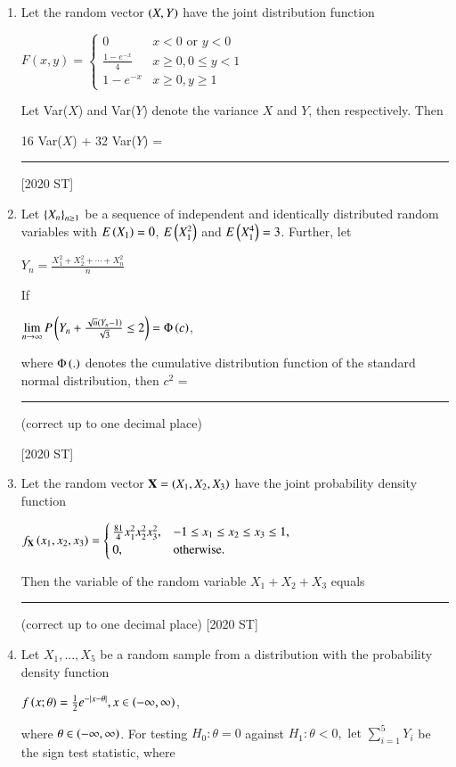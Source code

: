 \documentclass[journal]{IEEEtran}
\begin{document}
\begin{enumerate}
    \hfill [2020 ST]
    \item Let the random vector $\left(X,Y\right)$ have the joint distribution function 
    \begin{center}
        $F(x,y) = 
        \begin{cases}
            0 & x < 0 \text{ or } y < 0 \\
            \frac{1 - e ^{-x}}{4} & x \geq 0, 0 \leq y < 1 \\
            1 - e^{-x}& x \geq 0, y \geq 1
        \end{cases}$
    \end{center}
    Let Var($X$) and Var($Y$) denote the variance $X$ and $Y$, then respectively. Then 
    \begin{center}
        16 Var($X$) + 32 Var($Y$) = \rule{2cm}{0.4pt}
    \end{center}
    \hfill [2020 ST]
    \item Let $\left\{X_n\right\}_{n \geq 1}$ be a sequence of independent and identically distributed random variables with $E\left(X_1\right) = 0$, $E\left(X_1^2\right)$ and $E\left(X_1^4\right) = 3$. Further, let 
\begin{center}
    $Y_n = \frac{X_1^2 + X_2^2 +  \cdots + X_n^2}{n}$
\end{center}
If
\begin{center}
    $\lim \limits_{n \to \infty} P \left(Y_n + \frac{\sqrt{n}\left(Y_n - 1\right)}{\sqrt{3}} \leq 2\right) = \Phi\left(c\right)$,
\end{center}
where $\Phi\left(.\right)$ denotes the cumulative distribution function of the standard normal distribution, then $c^2$ = \rule{2cm}{0.4pt}(correct up to one decimal place)

\hfill [2020 ST]
\item Let the random vector $\mathbf{X} = \left(X_1, X_2, X_3\right)$ have the joint probability density function 
\begin{center}
    $f_{\mathbf{X}}\left(x_1,x_2,x_3\right) = 
    \begin{cases}
    \frac{81}{4} x_1^2 x_2^2 x_3^2, & -1 \leq x_1 \leq x_2 \leq x_3 \leq 1, \\
0, & \text{otherwise}.
    \end{cases}$ 
\end{center}
    
    Then the variable of the random variable $X_1 + X_2 + X_3$ equals \rule{2cm}{0.4pt}
    (correct up to one decimal place) \hfill[2020 ST]
    \item Let $X_1, \ldots ,X_5$ be a random sample from a distribution with the probability density function
    \begin{center}
        $f\left(x;\theta\right) = \frac{1}{2}e^{- \left\vert x - \theta\right\vert}, x \in \left(-\infty, \infty\right)$,
    \end{center}   
    where $\theta \in \left(-\infty, \infty\right)$. For testing $H_0 : \theta = 0$ against $H_1 : \theta < 0, \text{ let }  \sum_{i=1}^5 Y_i$  be the sign test statistic, where \\
    \begin{center}
        

\end{center}
\end{enumerate}
\end{document}
